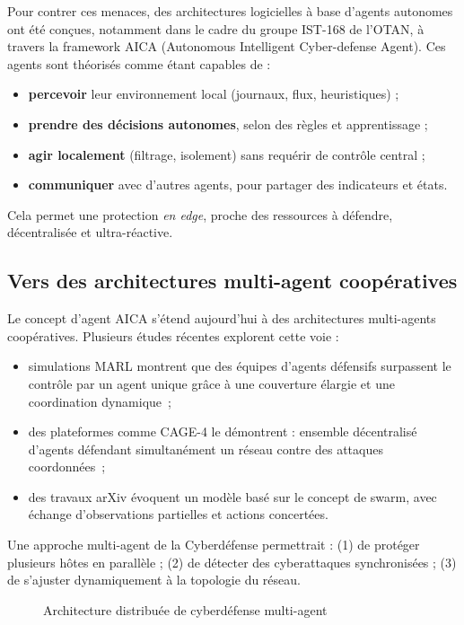 \documentclass[ twoside,openright,titlepage,numbers=noenddot,headinclude,%
                footinclude=true,cleardoublepage=empty,abstractoff, %
                BCOR=5mm,paper=a4,fontsize=11pt,%
                french,american,%
                ]{scrreprt}
\begin{document}
Pour contrer ces menaces, des architectures logicielles à base d'agents autonomes ont été conçues, notamment dans le cadre du groupe IST-168 de l'OTAN, à travers la framework AICA (Autonomous Intelligent Cyber-defense Agent). Ces agents sont théorisés comme étant capables de :
\begin{itemize}
  \item \textbf{percevoir} leur environnement local (journaux, flux, heuristiques) ;
  \item \textbf{prendre des décisions autonomes}, selon des règles et apprentissage ;
  \item \textbf{agir localement} (filtrage, isolement) sans requérir de contrôle central ;
  \item \textbf{communiquer} avec d'autres agents, pour partager des indicateurs et états.
\end{itemize}
Cela permet une protection {\em en edge}, proche des ressources à défendre, décentralisée et ultra-réactive.

\subsection*{Vers des architectures multi-agent coopératives}

Le concept d'agent AICA s'étend aujourd'hui à des architectures multi-agents coopératives. Plusieurs études récentes explorent cette voie :
\begin{itemize}
  \item simulations MARL montrent que des équipes d'agents défensifs surpassent le contrôle par un agent unique grâce à une couverture élargie et une coordination dynamique~\cite{RLResilientCyberdefense2024};
  \item des plateformes comme CAGE-4 le démontrent : ensemble décentralisé d'agents défendant simultanément un réseau contre des attaques coordonnées~\cite{cage_challenge_3_announcement};
  \item des travaux arXiv évoquent un modèle basé sur le concept de swarm, avec échange d'observations partielles et actions concertées.
\end{itemize}
Une approche multi-agent de la Cyberdéfense permettrait : (1) de protéger plusieurs hôtes en parallèle ; (2) de détecter des cyberattaques synchronisées ; (3) de s'ajuster dynamiquement à la topologie du réseau.

\begin{figure}[h]
  \centering
  \caption{Architecture distribuée de cyberdéfense multi-agent}
  \label{fig:distributed_sma}
\end{figure}
\end{document}
